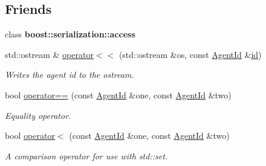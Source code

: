 \subsection*{Friends}
\begin{DoxyCompactItemize}
\item 
\hypertarget{classrepast_1_1_agent_id_ac98d07dd8f7b70e16ccb9a01abf56b9c}{class {\bfseries boost\-::serialization\-::access}}\label{classrepast_1_1_agent_id_ac98d07dd8f7b70e16ccb9a01abf56b9c}

\item 
\hypertarget{classrepast_1_1_agent_id_a99514e02ab7b8141d3997fe15d337e98}{std\-::ostream \& \hyperlink{classrepast_1_1_agent_id_a99514e02ab7b8141d3997fe15d337e98}{operator$<$$<$} (std\-::ostream \&os, const \hyperlink{classrepast_1_1_agent_id}{Agent\-Id} \&\hyperlink{classrepast_1_1_agent_id_af8482957f7cc22c0b79b7c62680af219}{id})}\label{classrepast_1_1_agent_id_a99514e02ab7b8141d3997fe15d337e98}

\begin{DoxyCompactList}\small\item\em Writes the agent id to the ostream. \end{DoxyCompactList}\item 
\hypertarget{classrepast_1_1_agent_id_a82148a933e439e1ec53d491438beeb6a}{bool \hyperlink{classrepast_1_1_agent_id_a82148a933e439e1ec53d491438beeb6a}{operator==} (const \hyperlink{classrepast_1_1_agent_id}{Agent\-Id} \&one, const \hyperlink{classrepast_1_1_agent_id}{Agent\-Id} \&two)}\label{classrepast_1_1_agent_id_a82148a933e439e1ec53d491438beeb6a}

\begin{DoxyCompactList}\small\item\em Equality operator. \end{DoxyCompactList}\item 
\hypertarget{classrepast_1_1_agent_id_a96354ea883cef44bf168f04f38d197a1}{bool \hyperlink{classrepast_1_1_agent_id_a96354ea883cef44bf168f04f38d197a1}{operator$<$} (const \hyperlink{classrepast_1_1_agent_id}{Agent\-Id} \&one, const \hyperlink{classrepast_1_1_agent_id}{Agent\-Id} \&two)}\label{classrepast_1_1_agent_id_a96354ea883cef44bf168f04f38d197a1}

\begin{DoxyCompactList}\small\item\em A comparison operator for use with std\-::set. \end{DoxyCompactList}\end{DoxyCompactItemize}



